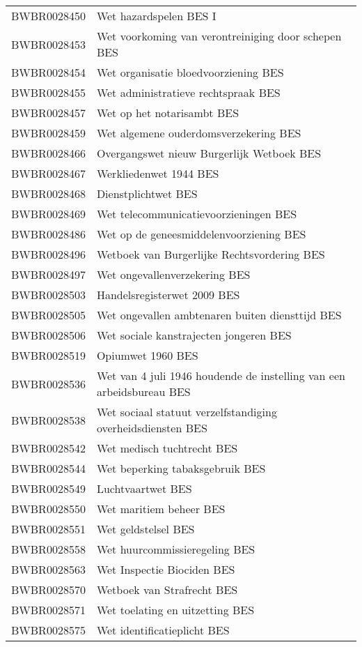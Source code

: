 \begin{longtable}{lp{}}
BWBR0028450 & Wet hazardspelen BES I \\
BWBR0028453 & Wet voorkoming van verontreiniging door schepen BES  \\
BWBR0028454 & Wet organisatie bloedvoorziening BES \\
BWBR0028455 & Wet administratieve rechtspraak BES  \\
BWBR0028457 & Wet op het notarisambt BES \\
BWBR0028459 & Wet algemene ouderdomsverzekering BES \\
BWBR0028466 & Overgangswet nieuw Burgerlijk Wetboek BES \\
BWBR0028467 & Werkliedenwet 1944 BES \\
BWBR0028468 & Dienstplichtwet BES \\
BWBR0028469 & Wet telecommunicatievoorzieningen BES \\
BWBR0028486 & Wet op de geneesmiddelenvoorziening BES \\
BWBR0028496 & Wetboek van Burgerlijke Rechtsvordering BES  \\
BWBR0028497 & Wet ongevallenverzekering BES  \\
BWBR0028503 & Handelsregisterwet 2009 BES  \\
BWBR0028505 & Wet ongevallen ambtenaren buiten diensttijd BES \\
BWBR0028506 & Wet sociale kanstrajecten jongeren BES \\
BWBR0028519 & Opiumwet 1960 BES  \\
BWBR0028536 & Wet van 4 juli 1946 houdende de instelling van een arbeidsbureau BES \\
BWBR0028538 & Wet sociaal statuut verzelfstandiging overheidsdiensten BES \\
BWBR0028542 & Wet medisch tuchtrecht BES  \\
BWBR0028544 & Wet beperking tabaksgebruik BES  \\
BWBR0028549 & Luchtvaartwet BES \\
BWBR0028550 & Wet maritiem beheer BES \\
BWBR0028551 & Wet geldstelsel BES \\
BWBR0028558 & Wet huurcommissieregeling BES \\
BWBR0028563 & Wet Inspectie Biociden BES \\
BWBR0028570 & Wetboek van Strafrecht BES \\
BWBR0028571 & Wet toelating en uitzetting BES  \\
BWBR0028575 & Wet identificatieplicht BES  \\

\end{longtable}
